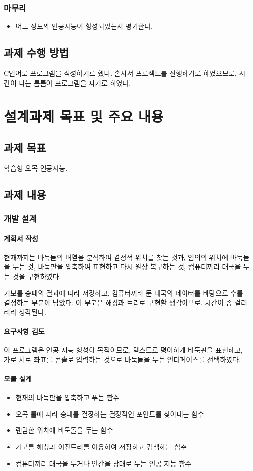 \documentclass[12pt,a4paper]{report}
\begin{document}
\subsection{마무리}
\begin{itemize}
	\item 어느 정도의 인공지능이 형성되었는지 평가한다.
\end{itemize}

\section{과제 수행 방법}
C언어로 프로그램을 작성하기로 했다.
혼자서 프로젝트를 진행하기로 하였으므로, 시간이 나는 틈틈이 프로그램을 짜기로 하였다.



\chapter{설계과제 목표 및 주요 내용}
\section{과제 목표}
학습형 오목 인공지능.
\section{과제 내용}
\subsection{개발 설계}
\subsubsection{계획서 작성}
현재까지는 바둑돌의 배열을 분석하여 결정적 위치를 찾는 것과, 임의의 위치에 바둑돌을 두는 것, 바둑판을 압축하여 표현하고 다시 원상 복구하는 것, 컴퓨터끼리 대국을 두는 것을 구현하였다.

기보를 승패의 결과에 따라 저장하고, 컴퓨터끼리 둔 대국의 데이터를 바탕으로 수를 결정하는 부분이 남았다.
이 부분은 해싱과 트리로 구현할 생각이므로, 시간이 좀 걸리리라 생각된다.
\subsubsection{요구사항 검토}
이 프로그램은 인공 지능 형성이 목적이므로, 텍스트로 평이하게 바둑판을 표현하고, 가로 세로 좌표를 콘솔로 입력하는 것으로 바둑돌을 두는 인터페이스를 선택하였다.
\subsubsection{모듈 설계}
\begin{itemize}
\item 현재의 바둑판을 압축하고 푸는 함수
\item 오목 룰에 따라 승패를 결정하는 결정적인 포인트를 찾아내는 함수
\item 랜덤한 위치에 바둑돌을 두는 함수
\item 기보를 해싱과 이진트리를 이용하여 저장하고 검색하는 함수
\item 컴퓨터끼리 대국을 두거나 인간을 상대로 두는 인공 지능 함수
\end{itemize}
\end{document}
